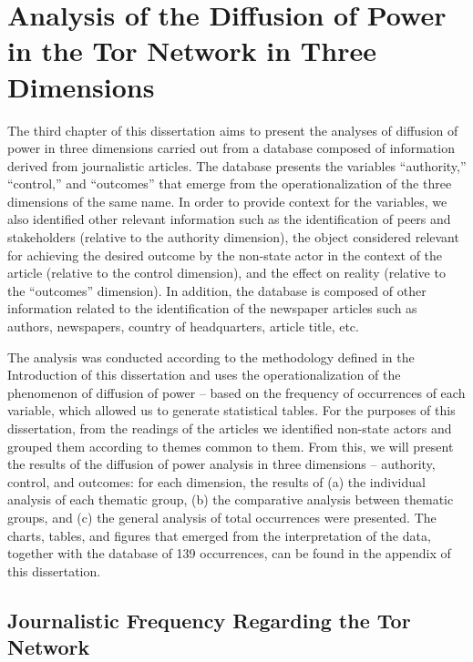 \chapter{Analysis of the Diffusion of Power in the Tor Network in Three Dimensions}

\setcounter{footnote}{145} %

The third chapter of this dissertation aims to present the analyses of diffusion of power in three dimensions carried out from a database composed of information derived from journalistic articles. The database presents the variables ``authority,'' ``control,'' and ``outcomes'' that emerge from the operationalization of the three dimensions of the same name. In order to provide context for the variables, we also identified other relevant information such as the identification of peers and stakeholders (relative to the authority dimension), the object considered relevant for achieving the desired outcome by the non-state actor in the context of the article (relative to the control dimension), and the effect on reality (relative to the ``outcomes'' dimension). In addition, the database is composed of other information related to the identification of the newspaper articles such as authors, newspapers, country of headquarters, article title, etc.

The analysis was conducted according to the methodology defined in the Introduction of this dissertation and uses the operationalization of the phenomenon of diffusion of power -- based on the frequency of occurrences of each variable, which allowed us to generate statistical tables. For the purposes of this dissertation, from the readings of the articles we identified non-state actors and grouped them according to themes common to them. From this, we will present the results of the diffusion of power analysis in three dimensions -- authority, control, and outcomes: for each dimension, the results of (a) the individual analysis of each thematic group, (b) the comparative analysis between thematic groups, and (c) the general analysis of total occurrences were presented. The charts, tables, and figures that emerged from the interpretation of the data, together with the database of 139 occurrences, can be found in the appendix of this dissertation.

\section{Journalistic Frequency Regarding the Tor Network}

